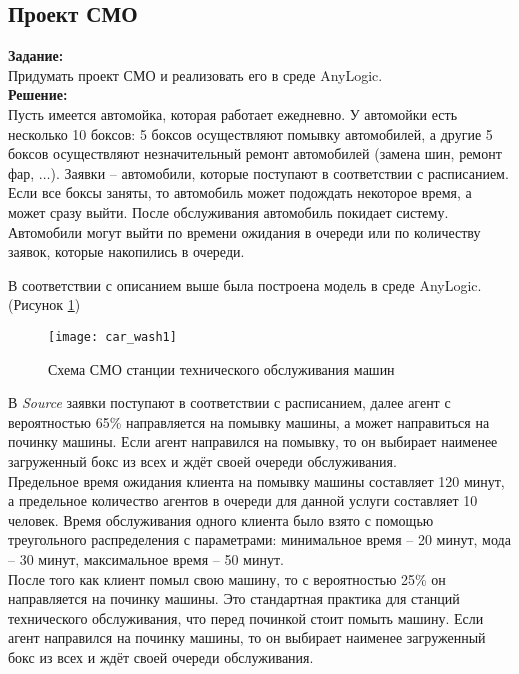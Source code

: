 \subsection*{Проект СМО}

\textbf{Задание:}\\
Придумать проект СМО и реализовать его в среде AnyLogic.\\

\textbf{Решение:}\\
Пусть имеется автомойка, которая работает ежедневно. У автомойки есть несколько 10 боксов: 5 боксов осуществляют помывку автомобилей, а другие 5 боксов осуществляют незначительный ремонт автомобилей (замена шин, ремонт фар, $\dots$). Заявки -- автомобили, которые поступают в соответствии с расписанием. Если все боксы заняты, то автомобиль может подождать некоторое время, а может сразу выйти. После обслуживания автомобиль покидает систему.\\

Автомобили могут выйти по времени ожидания в очереди или по количеству заявок, которые накопились в очереди.

В соответствии с описанием выше была построена модель в среде AnyLogic. (Рисунок \ref{fig:car_wash1})
\begin{figure}[h]
	\centering \texttt{[image: car\_wash1]}
	\caption{Схема СМО станции технического обслуживания машин}
	\label{fig:car_wash1}
\end{figure}

\newpage

В \textit{Source} заявки поступают в соответствии с расписанием, далее агент с вероятностью 65\% направляется на помывку машины, а может направиться на починку машины. Если агент направился на помывку, то он выбирает наименее загруженный бокс из всех и ждёт своей очереди обслуживания.\\

Предельное время ожидания клиента на помывку машины составляет 120 минут, а предельное количество агентов в очереди для данной услуги составляет 10 человек. Время обслуживания одного клиента было взято с помощью треугольного распределения с параметрами: минимальное время -- 20 минут, мода -- 30 минут, максимальное время -- 50 минут.\\

После того как клиент помыл свою машину, то с вероятностью 25\% он направляется на починку машины. Это стандартная практика для станций технического обслуживания, что перед починкой стоит помыть машину. Если агент направился на починку машины, то он выбирает наименее загруженный бокс из всех и ждёт своей очереди обслуживания.\\

